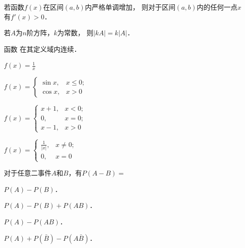 \documentclass[plain,noanswer,medmath]{../../template/jnuexam}
\begin{document}










\begin{problem}
若函数$f(x)$在区间$(a,b)$内严格单调增加，
则对于区间$(a,b)$内的任何一点$x$有$f'(x)>0$．\tickout{}
\end{problem}


\begin{problem}
若$A$为$n$阶方阵，$k$为常数，%
则$|kA| = k|A|$．\tickout{}
\end{problem}






\begin{problem}
函数 \pickin{} 在其定义域内连续．
\begin{abcd}
\item $f(x) = \frac{1}{x}$
\item $f(x) = \begin{cases}
  \sin x,& x \le 0; \\
  \cos x,& x > 0
\end{cases}$
\item $f(x) = \begin{cases}
  x + 1, & x < 0; \\
      0, & x = 0; \\
  x - 1, & x > 0
\end{cases}$
\item $f(x) = \begin{cases}
  \frac{1}{|x|}, & x \ne 0; \\
              0, & x = 0
\end{cases}$
\end{abcd}
\end{problem}








\begin{problem}
对于任意二事件$A$和$B$，有$P(A-B)=$\pickout{}
\begin{abcd}
\item $P(A) - P(B)$．
\item $P(A) - P(B) + P(AB)$．
\item $P(A) - P(AB)$．
\item $P(A) + P(\bar B) - P(A\bar B)$．
\end{abcd}
\end{problem}
\end{document}
